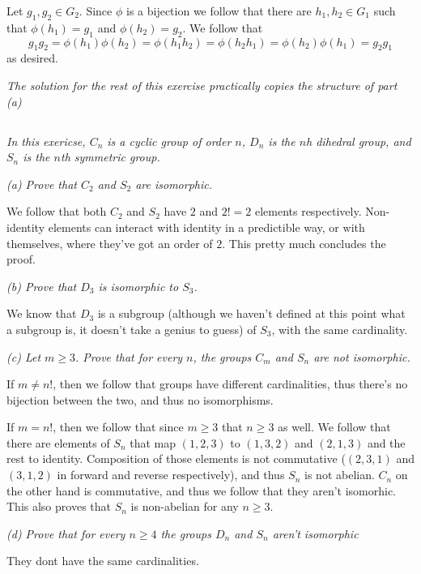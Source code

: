 \documentclass[11pt,oneside,titlepage]{book}
\begin{document}
Let $g_1, g_2 \in G_2$. Since $\phi$ is a bijection we follow that
there are $h_1, h_2 \in G_1$ such that $\phi(h_1) = g_1$ and
$\phi(h_2) = g_2$.  We follow that
$$g_1 g_2 = \phi(h_1) \phi(h_2) = \phi(h_1 h_2) = \phi(h_2 h_1) = \phi(h_2) \phi(h_1) = g_2 g_1$$
as desired.

\textit{The solution for the rest of this exercise practically copies
the structure of part (a) }

\subsection{}

\textit{In this exericse, $C_n$ is a cyclic group of order $n$, $D_n$
is the $n$h dihedral group, and $S_n$ is the $n$th symmetric group.}

\textit{(a) Prove that $C_2$ and $S_2$ are isomorphic.}

We follow that both $C_2$ and $S_2$ have $2$ and $2! = 2$ elements
respectively. Non-identity elements can interact with identity in a
predictible way, or with themselves, where they've got an order of
$2$. This pretty much concludes the proof.

\textit{(b) Prove that $D_3$ is isomorphic to $S_3$.}

We know that $D_3$ is a subgroup (although we haven't defined at this
point what a subgroup is, it doesn't take a genius to guess) of $S_3$,
with the same cardinality.

\textit{(c) Let $m \geq 3$. Prove that for every $n$, the groups $C_m$
and $S_n$ are not isomorphic.}

If $m \neq n!$, then we follow that groups have different
cardinalities, thus there's no bijection between the two, and thus no
isomorphisms.

If $m = n!$, then we follow that since $m \geq 3$ that $n \geq 3$ as
well.  We follow that there are elements of $S_n$ that map $(1, 2, 3)$
to $(1, 3, 2)$ and $(2, 1, 3)$ and the rest to identity. Composition
of those elements is not commutative ($(2, 3, 1)$ and $(3, 1, 2)$ in
forward and reverse respectively), and thus $S_n$ is not abelian.
$C_n$ on the other hand is commutative, and thus we follow that they
aren't isomorhic. This also proves that $S_n$ is non-abelian for any
$n \geq 3$.

\textit{(d) Prove that for every $n \geq 4$ the groups $D_n$ and $S_n$
aren't isomorphic}

They dont have the same cardinalities.
\end{document}
